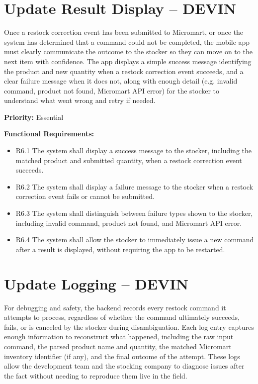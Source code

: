 \documentclass{scrreprt}
\begin{document}
\section{Update Result Display -- DEVIN}
Once a restock correction event has been submitted to Micromart, or once the system has determined that a command could not be completed, the mobile app must clearly communicate the outcome to the stocker so they can move on to the next item with confidence. The app displays a simple success message identifying the product and new quantity when a restock correction event succeeds, and a clear failure message when it does not, along with enough detail (e.g. invalid command, product not found, Micromart API error) for the stocker to understand what went wrong and retry if needed.

\textbf{Priority:} Essential

\textbf{Functional Requirements:}
\begin{itemize}
    \item R6.1 The system shall display a success message to the stocker, including the matched product and submitted quantity, when a restock correction event succeeds.
    \item R6.2 The system shall display a failure message to the stocker when a restock correction event fails or cannot be submitted.
    \item R6.3 The system shall distinguish between failure types shown to the stocker, including invalid command, product not found, and Micromart API error.
    \item R6.4 The system shall allow the stocker to immediately issue a new command after a result is displayed, without requiring the app to be restarted.
\end{itemize}

\section{Update Logging -- DEVIN}
For debugging and safety, the backend records every restock command it attempts to process, regardless of whether the command ultimately succeeds, fails, or is canceled by the stocker during disambiguation. Each log entry captures enough information to reconstruct what happened, including the raw input command, the parsed product name and quantity, the matched Micromart inventory identifier (if any), and the final outcome of the attempt. These logs allow the development team and the stocking company to diagnose issues after the fact without needing to reproduce them live in the field.
\end{document}
